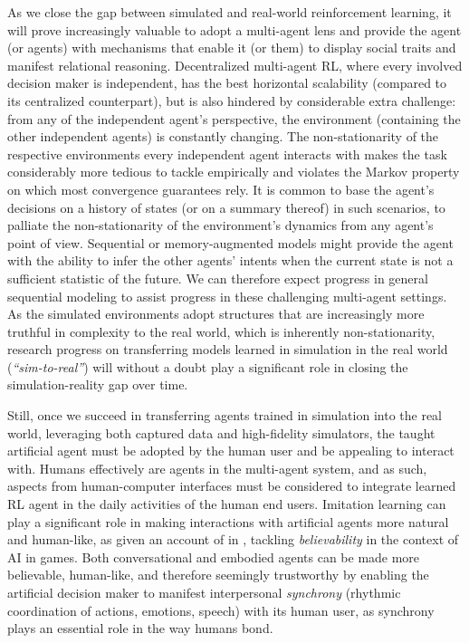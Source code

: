 As we close the gap between simulated and real-world reinforcement learning, it will prove increasingly valuable to
adopt a multi-agent lens and provide the agent (or agents) with mechanisms
that enable it (or them) to display social traits and manifest relational reasoning.
Decentralized multi-agent RL, where every involved decision maker is independent,
has the best horizontal scalability (compared to its centralized counterpart), but is also
hindered by considerable extra challenge:
from any of the independent agent's perspective, the environment (containing the other independent agents) is
constantly changing.
The non-stationarity of the respective environments every independent agent interacts with
makes the task considerably more tedious to tackle empirically and violates the Markov property
on which most convergence guarantees rely.
It is common to base the agent's decisions on a history of states (or on a summary thereof) in such scenarios,
to palliate the non-stationarity of the environment's dynamics from any agent's point of view.
Sequential or memory-augmented models might provide the agent with the ability to infer the other agents' intents
when the current state is not a sufficient statistic of the future.
We can therefore expect progress in general sequential modeling to assist progress in
these challenging multi-agent settings.
As the simulated environments adopt structures that are increasingly more truthful in complexity
to the real world, which is inherently non-stationarity,
research progress on transferring models learned in simulation in the real world (\textit{``sim-to-real''}) will
without a doubt play a significant role in closing the simulation-reality gap over time.

Still, once we succeed in transferring agents trained in simulation into the real world,
leveraging both captured data and high-fidelity simulators,
the taught artificial agent must be adopted by the human user and be appealing to interact with.
Humans effectively are agents in the multi-agent system, and as such,
aspects from human-computer interfaces must be considered to integrate learned RL agent in
the daily activities of the human end users.
Imitation learning can play a significant role in making interactions with artificial agents
more natural and human-like, as given an account of in
\cite{Livingstone2006-ln,Tence2010-qt},
tackling \emph{believability} in the context of AI in games.
Both conversational and embodied agents can be made more believable, human-like,
and therefore seemingly trustworthy by enabling the artificial decision maker to manifest
interpersonal \emph{synchrony}
(rhythmic coordination of actions, emotions, speech)
with its human user,
as synchrony plays an essential role in the way humans bond.



